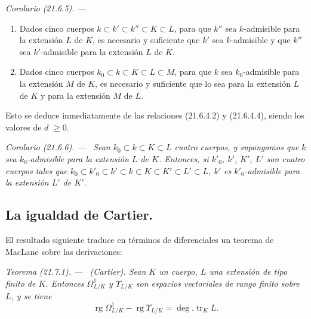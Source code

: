 \documentclass[10pt,oneside]{book}
\makeatletter
\newcommand{\setmanualcurrentlabel}[1]{\def\@currentlabel{#1}}
\newcommand{\oldpage}[2][]{%
  \setcounter{footnote}{0}%
  \marginpar{\scriptsize\textbf{#1}~|~#2}\ignorespaces}
\newenvironment{theorem}[1][]{%
  \setmanualcurrentlabel{#1}\par\medskip\noindent\itshape Teorema (#1). ---\ }{\par}
\newenvironment{corollary}[1][]{%
  \setmanualcurrentlabel{#1}\par\medskip\noindent\itshape Corolario (#1). ---\ }{\par}
\providecommand{\setmin}{-}%
\makeatother
\begin{document}
\begin{corollary}[21.6.5]
\label{0.21.6.5-es}
\begin{enumerate}
  \item[\textup{(i)}] Dados cinco cuerpos $k\subset k'\subset k''\subset K\subset L$,
  para que $k''$ sea $k$-admisible para la extensión $L$ de $K$, es necesario y
  suficiente que $k'$ sea $k$-admisible y que $k''$ sea $k'$-admisible
  para la extensión $L$ de $K$.
  \item[\textup{(ii)}] Dados cinco cuerpos
  $k_0\subset k\subset K\subset L\subset M$, para que $k$ sea
  $k_0$-admisible para la extensión $M$ de $K$, es necesario y suficiente que lo
  sea para la extensión $L$ de $K$ y para la extensión $M$ de $L$.
\end{enumerate}

Esto se deduce inmediatamente de las relaciones (21.6.4.2) y (21.6.4.4), siendo
los valores de $d$ $\geqslant0$.
\end{corollary}

\begin{corollary}[21.6.6]
\label{0.21.6.6-es}
Sean $k_0\subset k\subset K\subset L$ cuatro cuerpos, y supongamos que $k$
sea $k_0$-admisible para la extensión $L$ de $K$. Entonces, si $k'_0$, $k'$,
$K'$, $L'$ son cuatro cuerpos tales que
$k_0\subset k'_0\subset k'\subset k\subset K\subset K'\subset L'\subset L$,
$k'$ es $k'_0$-admisible para la extensión $L'$ de $K'$.
\end{corollary}

\subsection{La igualdad de Cartier.}
\label{subsection:0.21.7-es}

El resultado siguiente traduce en términos de diferenciales un teorema de
MacLane sobre las derivaciones:

\oldpage[0\textsubscript{IV-1}]{170}
\begin{theorem}[21.7.1]
\label{0.21.7.1-es}
\textnormal{(Cartier).}
Sean $K$ un cuerpo, $L$ una extensión de tipo finito de $K$. Entonces
$\Omega^1_{L/K}$ y $\Upsilon_{L/K}$ son espacios vectoriales de rango
finito sobre $L$, y se tiene
\begin{equation}
\tag{21.7.1.1}
\label{0.21.7.1.1-es}
\operatorname{rg}\Omega^1_{L/K}\setmin\operatorname{rg}\Upsilon_{L/K}
=\deg.\operatorname{tr}_K L.
\end{equation}
\end{theorem}
\end{document}
